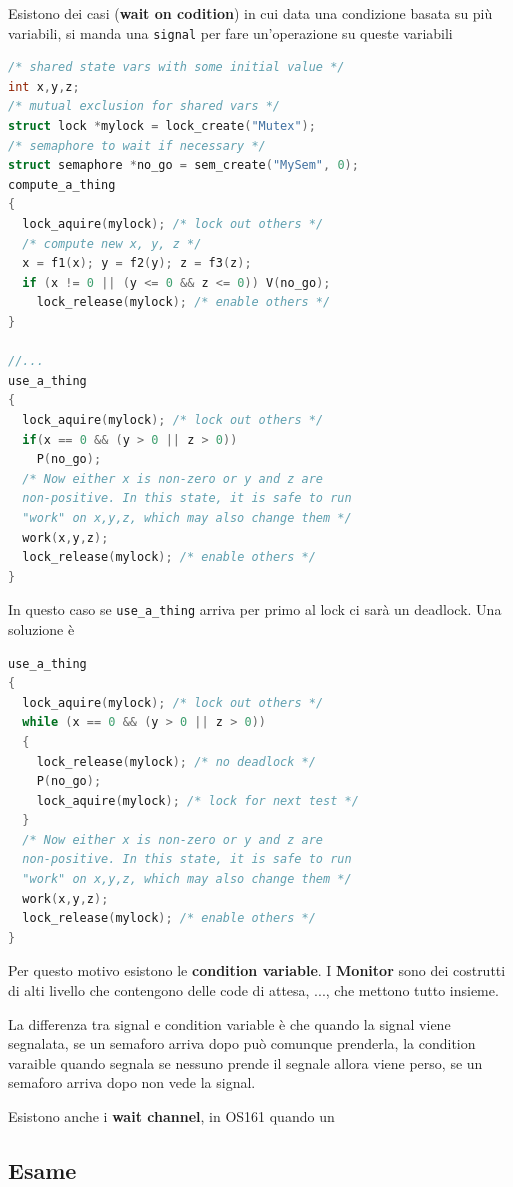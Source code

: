 \documentclass[12pt]{article}
\begin{document}
Esistono dei casi (\textbf{wait on codition}) in cui data una condizione basata su pi\`u variabili, si manda una \texttt{signal} per fare un'operazione su queste variabili
\begin{lstlisting}[language=c]
/* shared state vars with some initial value */
int x,y,z;
/* mutual exclusion for shared vars */
struct lock *mylock = lock_create("Mutex");
/* semaphore to wait if necessary */
struct semaphore *no_go = sem_create("MySem", 0);
compute_a_thing
{
  lock_aquire(mylock); /* lock out others */
  /* compute new x, y, z */
  x = f1(x); y = f2(y); z = f3(z);
  if (x != 0 || (y <= 0 && z <= 0)) V(no_go);
    lock_release(mylock); /* enable others */
}

//...
use_a_thing
{
  lock_aquire(mylock); /* lock out others */
  if(x == 0 && (y > 0 || z > 0))
    P(no_go);
  /* Now either x is non-zero or y and z are
  non-positive. In this state, it is safe to run
  "work" on x,y,z, which may also change them */
  work(x,y,z);
  lock_release(mylock); /* enable others */
}
\end{lstlisting}
In questo caso se \texttt{use\_a\_thing} arriva per primo al lock ci sar\`a un deadlock. Una soluzione \`e
\begin{lstlisting}[language=c]
use_a_thing 
{
  lock_aquire(mylock); /* lock out others */
  while (x == 0 && (y > 0 || z > 0)) 
  {
    lock_release(mylock); /* no deadlock */
    P(no_go);
    lock_aquire(mylock); /* lock for next test */
  }
  /* Now either x is non-zero or y and z are
  non-positive. In this state, it is safe to run
  "work" on x,y,z, which may also change them */
  work(x,y,z);
  lock_release(mylock); /* enable others */
}
\end{lstlisting}
Per questo motivo esistono le \textbf{condition variable}. I \textbf{Monitor} sono dei costrutti di alti livello che contengono delle code di attesa, ..., che mettono tutto insieme.

La differenza tra signal e condition variable \`e che quando la signal viene segnalata, se un semaforo arriva dopo pu\`o comunque prenderla, la condition varaible quando segnala se nessuno prende il segnale allora viene perso, se un semaforo arriva dopo non vede la signal.

Esistono anche i \textbf{wait channel}, in OS161 quando un 





\subsection{Esame}
\end{document}
